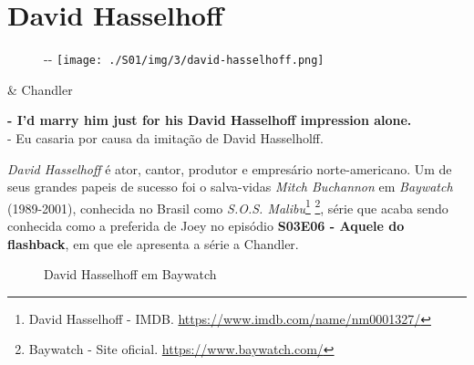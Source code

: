 \hypertarget{david-hasselhoff}{%
\section{David Hasselhoff}\label{david-hasselhoff}}

\begin{figure}[!ht]
  \begin{adjustwidth}{-\oddsidemargin-1in}{-\rightmargin}
    \centering
    \texttt{[image: ./S01/img/3/david-hasselhoff.png]}
  \end{adjustwidth}
\end{figure}

\begin{tcolorbox}[enhanced,center upper,
    drop fuzzy shadow southeast, boxrule=0.3pt,
    lower separated=false,
    colframe=black!30!dialogoBorder,colback=white]
\begin{minipage}[c]{0.16\linewidth}
   & \centering \scriptsize{Chandler}
\end{minipage}
\hfill
\begin{minipage}[c]{0.8\linewidth}
  \textbf{- I'd marry him just for his David Hasselhoff impression alone.}\\
  - Eu casaria por causa da imitação de David Hasselholff.
\end{minipage}
\end{tcolorbox}

\emph{David Hasselhoff} é ator, cantor, produtor e empresário
norte-americano. Um de seus grandes papeis de sucesso foi o salva-vidas
\emph{Mitch Buchannon} em \emph{Baywatch} (1989-2001), conhecida no
Brasil como \emph{S.O.S. Malibu}\footnote{\sloppy David Hasselhoff - IMDB. \url{https://www.imdb.com/name/nm0001327/}}
\footnote{\sloppy Baywatch - Site oficial. \url{https://www.baywatch.com/}},
série que acaba sendo conhecida como a preferida de Joey no episódio
\textbf{\textcolor{primarycolor}{S03E06 - Aquele do flashback}}, em que
ele apresenta a série a Chandler.

\begin{figure}
  \centering
    \caption{David Hasselhoff em Baywatch\label{fig:david-hasselhoff-em-baywatch}}
\end{figure}

